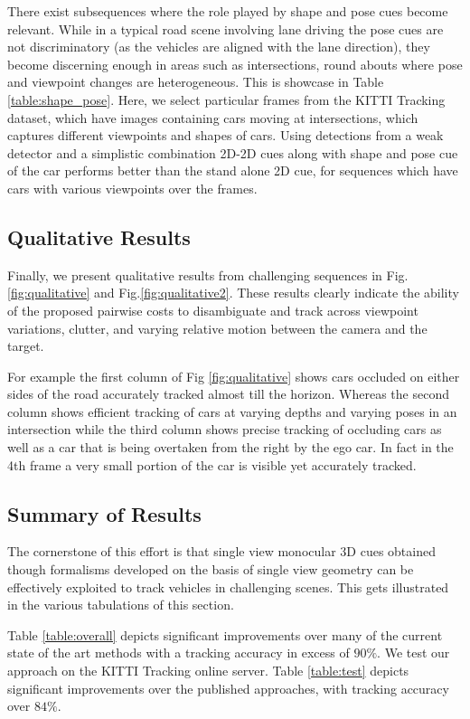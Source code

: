 \documentclass[letterpaper, 10 pt, conference]{ieeeconf}
\begin{document}
There exist subsequences where the role played by shape and pose cues become relevant. While in a typical road scene involving lane driving the pose cues are not discriminatory (as the vehicles are aligned with the lane direction), they become discerning enough in areas such as intersections, round abouts where pose and viewpoint changes are heterogeneous. This is showcase in Table \ref{table:shape_pose}. Here, we select particular frames from the KITTI Tracking dataset, which  have images containing cars moving at intersections, which captures different viewpoints and shapes of cars. Using detections from a weak detector \cite{SubCNN} and a simplistic combination 2D-2D cues along with shape and pose cue of the car performs better than the stand alone 2D cue, for sequences which have cars with various viewpoints over the frames.

\subsection{Qualitative Results}

Finally, we present qualitative results from challenging sequences in Fig.\ref{fig:qualitative} and Fig.\ref{fig:qualitative2}. 
These results clearly indicate the ability of the proposed pairwise costs to disambiguate and track across viewpoint variations, clutter, and varying relative motion between the camera and the target.

For example the first column of Fig \ref{fig:qualitative} shows cars occluded on either sides of the road accurately tracked almost till the horizon. Whereas the second column shows efficient tracking of cars at varying depths and varying poses in an intersection while the third column shows precise tracking of occluding cars as well as a car that is being overtaken from the right by the ego car. In fact  in the 4th frame a very small portion of the car is visible yet accurately tracked.

\subsection{Summary of Results}

The cornerstone of this effort is that single view monocular 3D cues obtained though formalisms developed on the basis of single view geometry can be effectively exploited to track vehicles in challenging scenes. This gets illustrated in the various tabulations of this section. 

Table \ref{table:overall} depicts significant improvements over many of the current state of the art methods with a tracking accuracy in excess of $90\%$. 
We test our approach on the KITTI Tracking online server. Table \ref{table:test} depicts significant improvements over the published approaches, with tracking accuracy over $84\%$.
\end{document}
